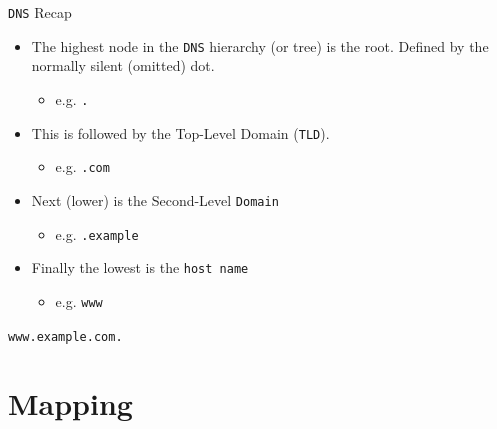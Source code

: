 \documentclass[xcolor=table]{beamer}
\begin{document}
\begin{frame}{\texttt{DNS} Recap}
  \begin{itemize}
    \item The highest node in the \texttt{DNS} hierarchy (or tree) is the root. Defined by the normally silent (omitted) dot. 
      \begin{itemize}
        \item e.g. \texttt{.}
      \end{itemize}
    \item This is followed by the Top-Level Domain (\texttt{TLD}). 
      \begin{itemize}
        \item e.g. \texttt{.com}
      \end{itemize}
    \item Next (lower) is the Second-Level \texttt{Domain}
      \begin{itemize}
        \item e.g. \texttt{.example}
      \end{itemize}
    \item Finally the lowest is the \texttt{host name}
      \begin{itemize}
        \item e.g. \texttt{www}
      \end{itemize}    
  \end{itemize}
  \begin{tcolorbox}
    \begin{center}
      \texttt{www.example.com.}      
    \end{center}
  \end{tcolorbox}
\end{frame}

\section{Mapping}
\end{document}
